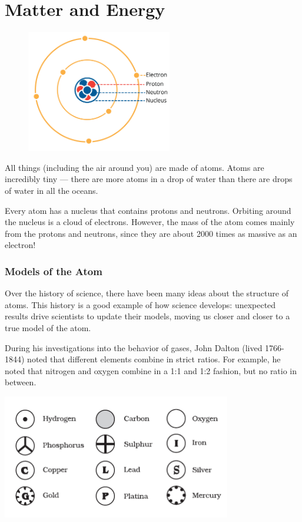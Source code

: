 \chapter{Matter and Energy}

\begin{figure}
\noindent\includegraphics[trim={0 5cm 0 0}, width=2.5in]{atom1.png}
\end{figure}

All things (including the air around you) are made of atoms. Atoms are
incredibly tiny --- there are more atoms in a drop of water than there are
drops of water in all the oceans.


Every atom has a nucleus that contains protons and neutrons. Orbiting around the
nucleus is a cloud of electrons. However, the mass of the atom
comes mainly from the protons and neutrons, since they are about 2000 times as
massive as an electron!  


\subsection{Models of the Atom}
Over the history of science, there have been many ideas about the structure of
atoms. This history is a good example of how science develops: unexpected
results drive scientists to update their models, moving us closer and closer to
a true model of the atom.

During his investigations into the behavior of gases,
John Dalton (lived 1766-1844) noted that different elements combine in strict
ratios. For example, he noted that nitrogen and oxygen combine in a 1:1 and 1:2
fashion, but no ratio in between.

\includegraphics[width=0.75\textwidth]{daltons_model.png}

